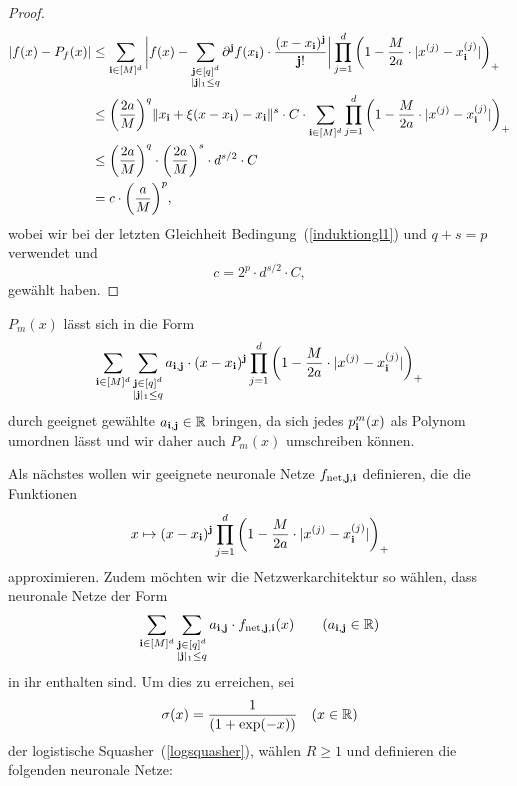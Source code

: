 \begin{proof}
\begin{equation*}
\begin{split}
|f(x) - P_f(x)| & \leq \sum_{\mathbf{i} \in [M]^d} \bigg|f(x) - \sum_{\substack{\mathbf{j} \in [q]^d \\|\mathbf{j}|_1 \leq q}} \partial^{\mathbf{j}}f(x_{\mathbf{i}}) \cdot \frac{(x - x_{\mathbf{i}})^{\mathbf{j}}}{\mathbf{j}!}\bigg| \prod_{j = 1}^d \bigg(1 - \frac{M}{2a} \cdot |x^{(j)} - x_{\mathbf{i}}^{(j)}|\bigg)_+ \\
& \leq \bigg(\frac{2a}{M}\bigg)^q \|x_{\mathbf{i}} + \xi(x - x_{\mathbf{i}}) - x_{\mathbf{i}} \|^s \cdot C \cdot \sum_{\mathbf{i} \in [M]^d} \prod_{j = 1}^d \bigg(1 - \frac{M}{2a} \cdot |x^{(j)} - x_{\mathbf{i}}^{(j)}|\bigg)_+ \\
& \leq \bigg(\frac{2a}{M}\bigg)^q \cdot \bigg(\frac{2a}{M}\bigg)^s \cdot d^{s/2} \cdot C\\
& = c \cdot \bigg(\frac{a}{M}\bigg)^p,
\end{split}
\end{equation*}
wobei wir bei der letzten Gleichheit Bedingung~(\ref{induktiongl1}) und $q + s = p$ verwendet und 
$$c = 2^p \cdot d^{s/2} \cdot C,$$
gewählt haben.
\end{proof}

$P_m(x)$ lässt sich in die Form 
$$\sum_{\mathbf{i} \in [M]^d} \sum_{\substack{ \mathbf{j} \in [q]^d\\|\mathbf{j}|_1 \leq q}} a_{\mathbf{i}, \mathbf{j}} \cdot (x - x_{\mathbf{i}})^{\mathbf{j}} \prod_{j = 1}^d \bigg(1 - \frac{M}{2a} \cdot |x^{(j)} - x_{\mathbf{i}}^{(j)}|\bigg)_+$$
durch geeignet gewählte $a_{\mathbf{i}, \mathbf{j}} \in \mathbb{R}$ bringen, da sich jedes $p^m_{\mathbf{i}}(x)$ als Polynom umordnen lässt und wir daher auch $P_m(x)$ umschreiben können.

Als nächstes wollen wir geeignete neuronale Netze $f_{\mathrm{net}, \mathbf{j}, \mathbf{i}}$ definieren, die die Funktionen
$$x \mapsto (x - x_{\mathbf{i}})^{\mathbf{j}} \prod_{j = 1}^d \bigg(1 - \frac{M}{2a} \cdot |x^{(j)} - x_{\mathbf{i}}^{(j)}|\bigg)_+$$ approximieren. Zudem möchten wir die Netzwerkarchitektur so wählen, dass neuronale Netze der Form
$$\sum_{\mathbf{i} \in [M]^d} \sum_{\substack{ \mathbf{j} \in [q]^d\\|\mathbf{j}|_1 \leq q}} a_{\mathbf{i}, \mathbf{j}} \cdot f_{\mathrm{net},\mathbf{j},\mathbf{i}}(x) \qquad (a_{\mathbf{i},\mathbf{j}} \in \mathbb{R})$$ in ihr enthalten sind.
Um dies zu erreichen, sei $$\sigma(x) = \frac{1}{(1 + \exp(-x))} \quad (x \in \mathbb{R})$$ der logistische Squasher~(\ref{logsquasher}), wählen $R \geq 1$ und definieren die folgenden neuronale Netze:

